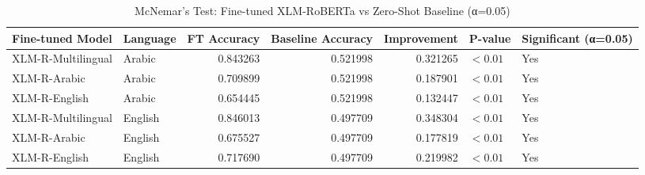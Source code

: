 \begin{table}
\caption{McNemar's Test: Fine-tuned XLM-RoBERTa vs Zero-Shot Baseline (α=0.05)}
\label{tab:mcnemar_finetuned_vs_baseline}
\begin{tabular}{llrrrll}
\toprule
Fine-tuned Model & Language & FT Accuracy & Baseline Accuracy & Improvement & P-value & Significant (α=0.05) \\
\midrule
XLM-R-Multilingual & Arabic & 0.843263 & 0.521998 & 0.321265 & $<0.01$ & Yes \\
XLM-R-Arabic & Arabic & 0.709899 & 0.521998 & 0.187901 & $<0.01$ & Yes \\
XLM-R-English & Arabic & 0.654445 & 0.521998 & 0.132447 & $<0.01$ & Yes \\
XLM-R-Multilingual & English & 0.846013 & 0.497709 & 0.348304 & $<0.01$ & Yes \\
XLM-R-Arabic & English & 0.675527 & 0.497709 & 0.177819 & $<0.01$ & Yes \\
XLM-R-English & English & 0.717690 & 0.497709 & 0.219982 & $<0.01$ & Yes \\
\bottomrule
\end{tabular}
\end{table}
